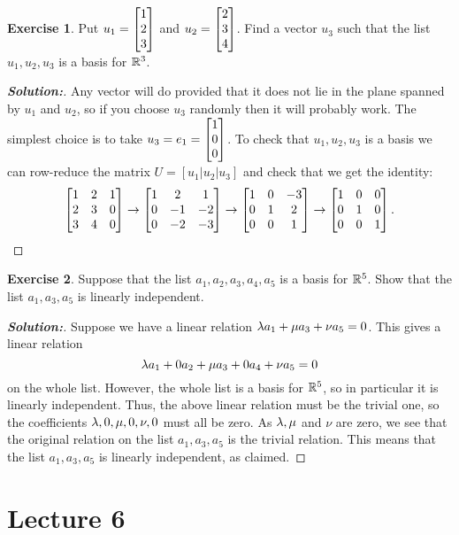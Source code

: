 \documentclass[a4paper]{amsart}
\theoremstyle{definition}
\newtheorem{exercise}{Exercise}
\newenvironment{solution}{\begin{proof}[\textbf{Solution:}] \vphantom{u}}{\end{proof}}
\begin{document}
\begin{exercise}\label{ex-basis-iii}
 Put $u_1=\left[\begin{matrix} 1\\2\\3\end{matrix}\right]$ and $u_2=\left[\begin{matrix} 2\\3\\4\end{matrix}\right]$.  Find a vector
 $u_3$ such that the list $u_1,u_2,u_3$ is a basis for ${\mathbb{R}}^3$.
\end{exercise}
\begin{solution}
 Any vector will do provided that it does not lie in the plane spanned
 by $u_1$ and $u_2$, so if you choose $u_3$ randomly then it will
 probably work.  The simplest choice is to take
 $u_3=e_1=\left[\begin{matrix} 1\\0\\0\end{matrix}\right]$.  To check that $u_1,u_2,u_3$ is a basis
 we can row-reduce the matrix $U=[u_1|u_2|u_3]$ and check that we get
 the identity:
 \[ 
  \left[\begin{matrix} 1 & 2 & 1 \\
       2 & 3 & 0 \\
       3 & 4 & 0 \end{matrix}\right] 
  \to 
  \left[\begin{matrix} 1 & 2 & 1 \\
       0 &-1 &-2 \\
       0 &-2 &-3 \end{matrix}\right] 
  \to 
  \left[\begin{matrix} 1 & 0 &-3 \\
       0 & 1 & 2 \\
       0 & 0 & 1 \end{matrix}\right] 
  \to 
  \left[\begin{matrix} 1 & 0 & 0 \\
       0 & 1 & 0 \\
       0 & 0 & 1 \end{matrix}\right]. 
 \]
\end{solution}

\begin{exercise}\label{ex-basis-iv}
 Suppose that the list $a_1,a_2,a_3,a_4,a_5$ is a basis for ${\mathbb{R}}^5$.
 Show that the list $a_1,a_3,a_5$ is linearly independent.
\end{exercise}
\begin{solution}
 Suppose we have a linear relation $\lambda a_1 + \mu a_3 + \nu a_5=0$.
 This gives a linear relation
 \[ \lambda a_1 + 0 a_2 + \mu a_3 + 0 a_4 + \nu a_5 = 0 \]
 on the whole list.  However, the whole list is a basis for ${\mathbb{R}}^5$, so
 in particular it is linearly independent.  Thus, the above linear
 relation must be the trivial one, so the coefficients
 $\lambda,0,\mu,0,\nu,0$ must all be zero.  As $\lambda,\mu$ and $\nu$ are
 zero, we see that the original relation on the list $a_1,a_3,a_5$ is
 the trivial relation.  This means that the list $a_1,a_3,a_5$ is
 linearly independent, as claimed.
\end{solution}

\section{Lecture 6}
\end{document}
